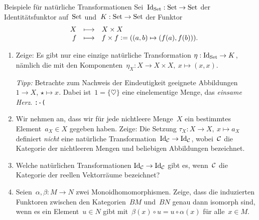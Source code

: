 \documentclass{uebblatt}
\begin{document}

\begin{aufgabe}{Beispiele für natürliche Transformationen}
Sei~$\mathrm{Id}_{\mathrm{Set}} : \mathrm{Set} \to \mathrm{Set}$ der Identitätsfunktor auf~$\mathrm{Set}$ und~$K : \mathrm{Set}
\to \mathrm{Set}$ der Funktor
\[ \begin{array}{@{}rrcl@{}}
  & X &\longmapsto& X \times X \\
  & f &\longmapsto& f \times f \defeq ((a,b) \mapsto (f(a),f(b))).
\end{array} \]
\begin{enumerate}
\item Zeige: Es gibt nur eine einzige natürliche Transformation $\eta : \mathrm{Id}_{\mathrm{Set}}
\to K$, nämlich die mit den Komponenten~$\eta_X : X \to X \times X,\ x \mapsto (x,x)$.

{\tiny
\emph{Tipp:} Betrachte zum Nachweis der Eindeutigkeit geeignete Abbildungen $1 \to X$, $\star
\mapsto x$. Dabei ist~$1 = \{\heartsuit\}$ eine einelementige Menge, das
\emph{einsame Herz}. \texttt{:-(}\par}
\item Wir nehmen an, dass wir für jede nichtleere Menge~$X$ ein bestimmtes
Element~$a_X \in X$ gegeben haben. Zeige:
Die Setzung
$\tau_X : X \to X,\ x \mapsto a_X$
definiert \emph{nicht} eine natürliche Transformation~$\mathrm{Id}_{\mathcal{C}} \to \mathrm{Id}_{\mathcal{C}}$,
wobei~$\mathcal{C}$ die Kategorie der nichtleeren Mengen und beliebigen Abbildungen
bezeichnet.
\item
Welche natürlichen Transformationen $\mathrm{Id}_{\mathcal{C}} \to \mathrm{Id}_{\mathcal{C}}$ gibt es,
wenn~$\mathcal{C}$ die Kategorie der reellen Vektorräume bezeichnet?
\item Seien~$\alpha, \beta : M \to N$ zwei Monoidhomomorphismen. Zeige, dass
die induzierten Funktoren zwischen den Kategorien~$BM$ und~$BN$ genau dann
isomorph sind, wenn es ein Element~$u \in N$ gibt mit~$\beta(x) \circ u = u
\circ \alpha(x)$ für alle~$x \in M$.
\end{enumerate}
\end{aufgabe}
\end{document}
